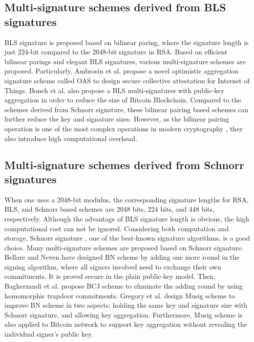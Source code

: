 \documentclass[journal]{IEEEtran}
\begin{document}
\subsection{Multi-signature schemes derived from BLS signatures}

BLS signature \cite{DBLP:conf/asiacrypt/BonehLS01} is proposed based on bilinear paring, where the signature length is just 224-bit compared to the 2048-bit signature in RSA. Based on efficient bilinear parings and elegant BLS signatures, various multi-signature schemes \cite{DBLP:conf/pkc/Boldyreva03}\cite{DBLP:conf/eurocrypt/RistenpartY07}\cite{DBLP:conf/ccs/AmbrosinCINSS16}\cite{07DBLP:conf/asiacrypt/BonehDN18} are proposed.
Particularly, Ambrosin et al. \cite{DBLP:conf/ccs/AmbrosinCINSS16} propose a novel optimistic aggregation signature scheme called OAS to design secure collective attestation for Internet of Things.
Boneh et al. \cite{07DBLP:conf/asiacrypt/BonehDN18} also propose a BLS multi-signatures with public-key aggregation in order to reduce the size of Bitcoin Blockchain.
Compared to the schemes derived from Schnorr signature, these bilinear pairing based schemes can further reduce the key and signature sizes. However, as the bilinear pairing operation is one of the most complex operations in modern cryptography \cite{DBLP:journals/tifs/HeZXH15}, they also introduce high computational overhead.


\subsection{Multi-signature schemes derived from Schnorr signatures}
When one uses a 2048-bit modulus, the corresponding signature lengths for RSA, BLS, and Schnorr based schemes are 2048 bits, 224 bits, and 448 bits, respectively. Although the advantage of BLS signature length is obvious, the high computational cost can not be ignored. Considering both computation and storage, Schnorr signature \cite{09DBLP:journals/joc/Schnorr91}, one of the best-known signature algorithms, is a good choice.
Many multi-signature schemes are proposed based on Schnorr signature.
Bellare and Neven \cite{04DBLP:conf/ccs/BellareN06} have designed BN scheme by adding one more round in the signing algorithm, where all signers involved need to exchange their own commitments. It is proved secure in the plain public-key model.
Then, Bagherzandi et al. \cite{35DBLP:conf/ccs/BagherzandiCJ08} propose BCJ scheme to eliminate the adding round by using homomorphic trapdoor commitments.
Gregory et al. \cite{DBLP:journals/dcc/MaxwellPSW19} design Musig scheme to improve BN scheme in two aspects: holding the same key and signature size with Schnorr signature, and allowing key aggregation. Furthermore, Musig scheme is also applied to Bitcoin network to support key aggregation without revealing the individual signer's public key.
\end{document}
